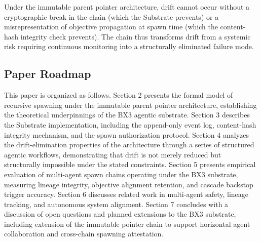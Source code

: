 Under the immutable parent pointer architecture, drift cannot occur without a cryptographic break in the chain (which the Substrate prevents) or a misrepresentation of objective propagation at spawn time (which the content-hash integrity check prevents). The chain thus transforms drift from a systemic risk requiring continuous monitoring into a structurally eliminated failure mode.

\subsection{Paper Roadmap}

This paper is organized as follows. Section 2 presents the formal model of recursive spawning under the immutable parent pointer architecture, establishing the theoretical underpinnings of the BX3 agentic substrate. Section 3 describes the Substrate implementation, including the append-only event log, content-hash integrity mechanism, and the spawn authorization protocol. Section 4 analyzes the drift-elimination properties of the architecture through a series of structured agentic workflows, demonstrating that drift is not merely reduced but structurally impossible under the stated constraints. Section 5 presents empirical evaluation of multi-agent spawn chains operating under the BX3 substrate, measuring lineage integrity, objective alignment retention, and cascade backstop trigger accuracy. Section 6 discusses related work in multi-agent safety, lineage tracking, and autonomous system alignment. Section 7 concludes with a discussion of open questions and planned extensions to the BX3 substrate, including extension of the immutable pointer chain to support horizontal agent collaboration and cross-chain spawning attestation.